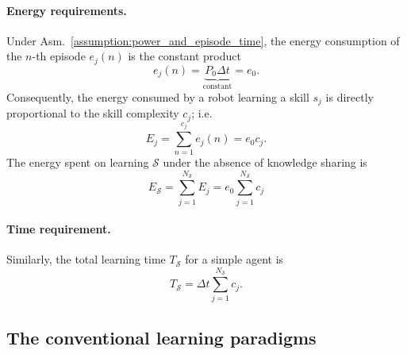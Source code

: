 \paragraph{Energy requirements.}
Under Asm.~\ref{assumption:power_and_episode_time}, the energy consumption of the $n$-th episode $e_j(n)$ is the constant product
\begin{equation}\label{eq:energy_per_episode}
	e_j(n) = \underbrace{P_0 \Delta t}_{\text{constant}} = e_0.
\end{equation}
Consequently, the energy consumed by a robot learning a skill $ s_j $ is directly proportional to the skill complexity $c_j$; i.e.
\begin{equation}\label{eq:energy_per_skill}
	E_j =\sum_{n=1}^{c_j} e_j(n) = e_0c_j.
\end{equation}
The energy spent on learning $\mathcal{S}$ under the absence of knowledge sharing is
\begin{equation}\label{eq:total_energy}
	E_{\mathcal{S}} = \sum_{j=1}^{{N_{\mathcal{S}}}} E_j = e_0 \sum_{j=1}^{{N_{\mathcal{S}}}} c_j%
\end{equation}
\paragraph{Time requirement.} Similarly, the total learning time $T_{\mathcal{S}}$ for a simple agent is
\begin{equation}\label{eq:total_time}
	T_{\mathcal{S}} = \Delta t \sum_{j=1}^{{N_{\mathcal{S}}}} c_j.
\end{equation}

\subsection{The conventional learning paradigms}\label{sec:types_of_learning}

